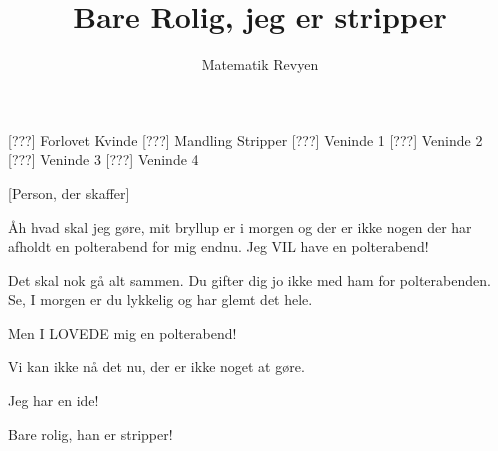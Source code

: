 \documentclass[a4paper,11pt]{article}
\title{Bare Rolig, jeg er stripper}
\author{Matematik Revyen}
\begin{document}
\maketitle

\begin{roles}
[???] Forlovet Kvinde
[???] Mandling Stripper
[???] Veninde 1
[???] Veninde 2
[???] Veninde 3
[???] Veninde 4
\end{roles}

\begin{props}
[Person, der skaffer]
\end{props}

\begin{sketch}

 Åh hvad skal jeg gøre, mit bryllup er i morgen og der er ikke nogen der har afholdt en polterabend for mig endnu. Jeg VIL have en polterabend!

 Det skal nok gå alt sammen. Du gifter dig jo ikke med ham for polterabenden. Se, I morgen er du lykkelig og har glemt det hele.

 Men I LOVEDE mig en polterabend!

 Vi kan ikke nå det nu, der er ikke noget at gøre.

 Jeg har en ide!


 Bare rolig, han er stripper!

\end{sketch}
\end{document}
